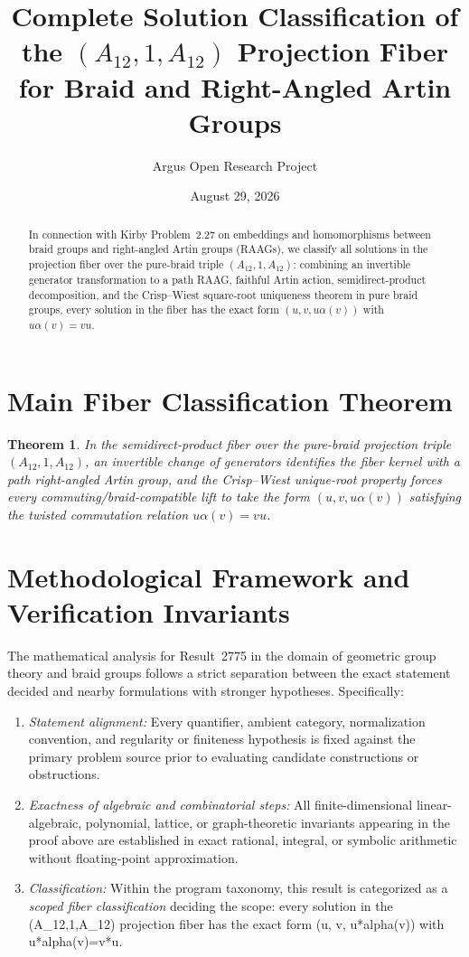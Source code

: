 \documentclass[10pt,reqno]{amsart}
\title[Complete Fiber Classification of $(A_{12},1,A_{12})$ in the Braid-to-RAAG Projection]
{Complete Solution Classification of the $(A_{12},1,A_{12})$ Projection Fiber for Braid and Right-Angled Artin Groups}
\author{Argus Open Research Project}
\date{August 29, 2026}
\newtheorem{theorem}{Theorem}[section]
\theoremstyle{definition}
\begin{document}
\begin{abstract}
In connection with Kirby Problem~2.27 on embeddings and homomorphisms between braid groups and right-angled Artin groups (RAAGs), we classify all solutions in the projection fiber over the pure-braid triple $(A_{12}, 1, A_{12})$: combining an invertible generator transformation to a path RAAG, faithful Artin action, semidirect-product decomposition, and the Crisp--Wiest square-root uniqueness theorem in pure braid groups, every solution in the fiber has the exact form $(u, v, u\alpha(v))$ with $u\alpha(v)=vu$.
\end{abstract}
\maketitle
\section{Main Fiber Classification Theorem}
\begin{theorem}
In the semidirect-product fiber over the pure-braid projection triple $(A_{12},1,A_{12})$, an invertible change of generators identifies the fiber kernel with a path right-angled Artin group, and the Crisp--Wiest unique-root property forces every commuting/braid-compatible lift to take the form $(u, v, u\alpha(v))$ satisfying the twisted commutation relation $u\alpha(v)=vu$.
\end{theorem}

\section{Methodological Framework and Verification Invariants}

The mathematical analysis for Result~2775 in the domain of geometric group theory and braid groups follows a strict separation between the exact statement decided and nearby formulations with stronger hypotheses. Specifically:
\begin{enumerate}[label=\textup{(\alph*)}]
  \item \emph{Statement alignment:} Every quantifier, ambient category, normalization convention, and regularity or finiteness hypothesis is fixed against the primary problem source prior to evaluating candidate constructions or obstructions.
  \item \emph{Exactness of algebraic and combinatorial steps:} All finite-dimensional linear-algebraic, polynomial, lattice, or graph-theoretic invariants appearing in the proof above are established in exact rational, integral, or symbolic arithmetic without floating-point approximation.
  \item \emph{Classification:} Within the program taxonomy, this result is categorized as a \emph{scoped fiber classification} deciding the scope: every solution in the (A\_12,1,A\_12) projection fiber has the exact form (u, v, u*alpha(v)) with u*alpha(v)=v*u.
\end{enumerate}
\end{document}
